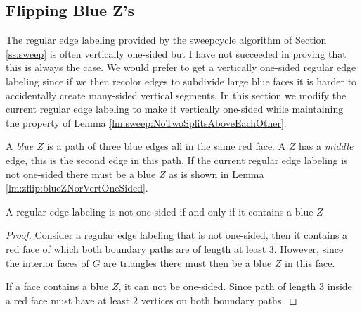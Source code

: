 
\subsection{Flipping Blue $\mathbf{Z}$'s}
\thispagestyle{plain}
\label{ss:flipBlueZ}

  The regular edge labeling provided by the sweepcycle algorithm of Section \ref{ss:sweep} is often vertically one-sided but I have not succeeded in proving that this is always the case.
  We would prefer to get a vertically one-sided regular edge labeling since if we then recolor edges to subdivide large blue faces it is harder to accidentally create many-sided vertical segments.
  In this section we modify the current regular edge labeling to make it vertically one-sided while maintaining the property of Lemma \ref{lm:sweep:NoTwoSplitsAboveEachOther}.


  A \emph{blue $Z$} is a path of three blue edges all in the same red face. A $Z$ has a \emph{middle} edge, this is the second edge in this path.
  If the current regular edge labeling is not one-sided there must be a blue $Z$ as is shown in Lemma \ref{lm:zflip:blueZNorVertOneSided}.
  \begin{lemma}
    \label{lm:zflip:blueZNorVertOneSided}
    A regular edge labeling is not one sided if and only if it contains a blue $Z$
  \end{lemma}
  \begin{proof}
    Consider a regular edge labeling that is not one-sided, then it contains a red face of which both boundary paths are of length at least $3$.
    However, since the interior faces of $G$ are triangles there must then be a blue $Z$ in this face.

    If a face contains a blue $Z$, it can not be one-sided. Since path of length $3$ inside a red face must have at least $2$ vertices on both boundary paths.
  \end{proof}

